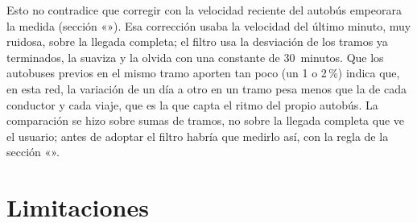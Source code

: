 Esto no contradice que corregir con la velocidad reciente del autobús empeorara la medida
(sección «»). Esa corrección usaba la velocidad del último minuto, muy ruidosa, sobre la llegada
completa; el filtro usa la desviación de los tramos ya terminados, la suaviza y la olvida con una constante de 30~minutos.
Que los autobuses previos en el mismo tramo aporten tan poco (un 1 o 2\,\%) indica que, en esta red, la variación de
un día a otro en un tramo pesa menos que la de cada conductor y cada viaje, que es la que capta el ritmo del propio
autobús. La comparación se hizo sobre sumas de tramos, no sobre la llegada completa que ve el usuario; antes de
adoptar el filtro habría que medirlo así, con la regla de la sección «».

\section{Limitaciones}
\label{sec:limitaciones}

